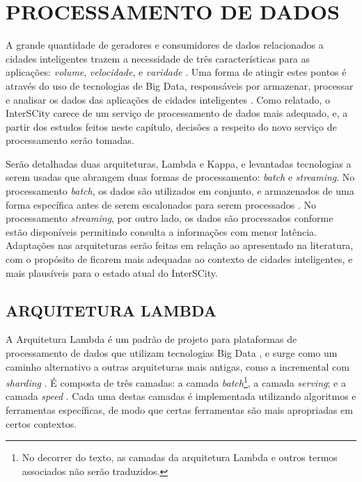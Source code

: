 \chapter[PROCESSAMENTO DE DADOS]{PROCESSAMENTO DE DADOS}
\label{chapter:data}

A grande quantidade de geradores e consumidores de dados relacionados a cidades
inteligentes trazem a necessidade de três características para as aplicações:
\textit{volume}, \textit{velocidade}, e \textit{varidade} \cite{alnuaimi2015}.
Uma forma de atingir estes pontos é através do uso de tecnologias de Big Data,
responsáveis por armazenar, processar e analisar os dados das aplicações de
cidades inteligentes \cite{alnuaimi2015}. Como relatado, o InterSCity carece de
um serviço de processamento de dados mais adequado, e, a partir dos estudos
feitos neste capítulo, decisões a respeito do novo serviço de processamento
serão tomadas.

Serão detalhadas duas arquiteturas, Lambda e Kappa, e levantadas tecnologias
a serem usadas que abrangem duas formas de processamento: \textit{batch} e
\textit{streaming}. No processamento \textit{batch}, os dados são utilizados
em conjunto, e armazenados de uma forma específica antes de serem escalonados
para serem processados \cite{zheng2015real}. No processamento
\textit{streaming}, por outro lado, os dados são processados conforme estão
disponíveis \cite{zheng2015real} permitindo consulta a informações com menor
latência. Adaptações nas arquiteturas serão feitas em relação ao apresentado na
literatura, com o propósito de ficarem mais adequadas ao contexto de cidades
inteligentes, e mais plausíveis para o estado atual do InterSCity.

\section{ARQUITETURA LAMBDA}

A Arquitetura Lambda é um padrão de projeto para plataformas de processamento
de dados que utilizam tecnologias Big Data \cite{kiran2015}, e surge como um
caminho alternativo a outras arquiteturas mais antigas, como a incremental com
\textit{sharding} \cite{marz2015}. É composta de três camadas: a camada
\textit{batch}\footnote{No decorrer do texto, as camadas da arquitetura Lambda
e outros termos associados não serão traduzidos.}, a camada \textit{serving}; e
a camada \textit{speed} \cite{kiran2015}. Cada uma destas camadas é
implementada utilizando algoritmos e ferramentas específicas, de modo
que certas ferramentas são mais apropriadas em certos contextos.

